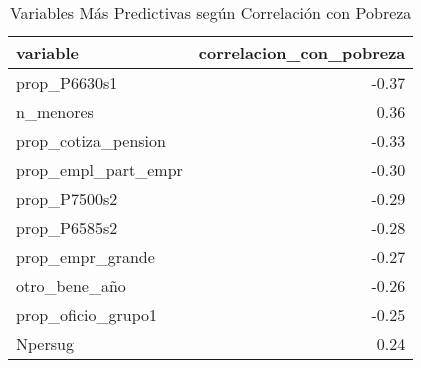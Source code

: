 \begin{table}[ht]
\centering
\begin{tabular}{lr}
  \toprule
variable & correlacion\_con\_pobreza \\ 
  \midrule
prop\_P6630s1 & -0.37 \\ 
  n\_menores & 0.36 \\ 
  prop\_cotiza\_pension & -0.33 \\ 
  prop\_empl\_part\_empr & -0.30 \\ 
  prop\_P7500s2 & -0.29 \\ 
  prop\_P6585s2 & -0.28 \\ 
  prop\_empr\_grande & -0.27 \\ 
  otro\_bene\_año & -0.26 \\ 
  prop\_oficio\_grupo1 & -0.25 \\ 
  Npersug & 0.24 \\ 
   \bottomrule
\end{tabular}
\caption{Variables Más Predictivas según Correlación con Pobreza} 
\label{tab:top_predictors}
\end{table}
